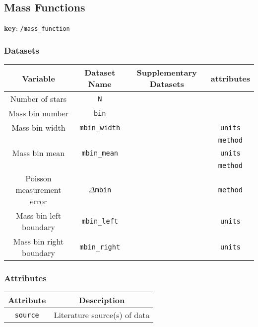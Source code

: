 \subsection{Mass Functions}

\textbf{key}: \texttt{/mass\_function}

\subsubsection{Datasets}

\begin{center}
\begin{tabular}{ | c | c | c | c | }
    \hline
    Variable & Dataset Name & Supplementary Datasets &  attributes \\
    \hline\hline
    Number of stars & \texttt{N} & & \\
    \hline
    Mass bin number & \texttt{bin} & & \\
    \hline
    Mass bin width & \texttt{mbin\_width} & &
    \texttt{units}\\ &&& \texttt{method} \\
    \hline
    Mass bin mean & \texttt{mbin\_mean} & &
    \texttt{units}\\ &&& \texttt{method} \\
    \hline
    Poisson measurement error & \texttt{\(\Delta\)mbin} & & \texttt{method} \\
    \hline
    Mass bin left boundary & \texttt{mbin\_left} & & \texttt{units}\\
    \hline
    Mass bin right boundary & \texttt{mbin\_right} & & \texttt{units}\\
    \hline
\end{tabular}
\end{center}

\subsubsection{Attributes}


\begin{center}
\begin{tabular}{ | c | c | }
    \hline
    Attribute & Description \\
    \hline\hline
    \texttt{source} & Literature source(s) of data \\
    \hline
\end{tabular}
\end{center}
